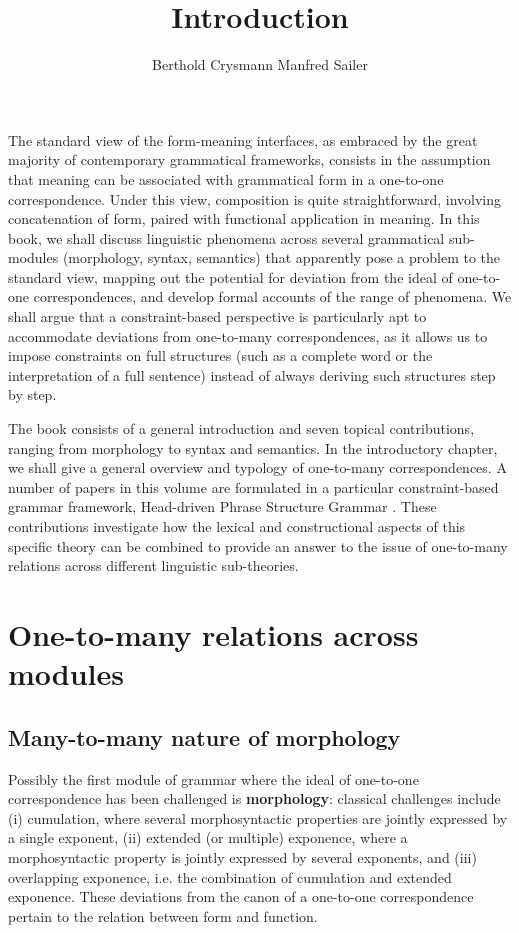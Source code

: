 \documentclass[output=paper]{langscibook}
\title{Introduction}
\author{Berthold Crysmann\affiliation{Université
    de Paris, Laboratoire de linguistique formelle, CNRS} \lastand
  Manfred Sailer\affiliation{Goethe-Universität Frankfurt a.M.}  }
\begin{document}
The standard view of the form-meaning interfaces, as embraced by the
great majority of contemporary grammatical frameworks, consists in the
assumption that meaning can be associated with grammatical form in a
one-to-one correspondence. Under this view, composition is quite
straightforward, involving concatenation of form, paired with
functional application in meaning. In this book, we shall discuss
linguistic phenomena across several grammatical sub-modules
(morphology, syntax, semantics) that apparently pose a problem to the
standard view, mapping out the potential for deviation from the ideal
of one-to-one correspondences, and develop formal accounts of the
range of phenomena. We shall argue that a constraint-based perspective
is particularly apt to accommodate deviations from one-to-many
correspondences, as it allows us to impose constraints on full
structures (such as a complete word or the interpretation of a full
sentence) instead of always deriving such structures step by step.


The book consists of a general introduction and seven topical contributions, ranging from
morphology to syntax and semantics. In the introductory chapter, we
shall give a general overview and typology of one-to-many
correspondences. A number of papers in this volume are formulated in a
particular constraint-based grammar framework, Head-driven Phrase
Structure Grammar \citep{Pollard94}. These contributions investigate
how the lexical and constructional aspects of this specific theory can
be combined to provide an answer to the issue of one-to-many relations
across different linguistic sub-theories.


\section{One-to-many relations across modules}

\subsection{Many-to-many nature of morphology}

Possibly the first module of grammar where the ideal of one-to-one
correspondence has been challenged is \textbf{morphology}: classical
challenges \citep{Matthews72} include (i) cumulation, where several
morphosyntactic properties are jointly expressed by a single exponent,
(ii) extended (or multiple) exponence, where a morphosyntactic
property is jointly expressed by several exponents, and (iii)
overlapping exponence, i.e. the combination of cumulation and extended
exponence. These deviations from the canon of a one-to-one
correspondence pertain to the relation between form and function.
\end{document}
